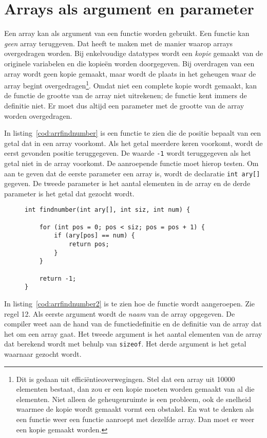 \section{Arrays als argument en parameter}
Een array kan als argument van een functie worden gebruikt. Een functie kan \textsl{geen} array teruggeven. Dat heeft te maken met de manier waarop arrays overgedragen worden. Bij enkelvoudige datatypes wordt een \textsl{kopie} gemaakt van de originele variabelen en die kopieën worden doorgegeven. Bij overdragen van een array wordt geen kopie gemaakt, maar wordt de plaats in het geheugen waar de array begint overgedragen\footnote{Dit is gedaan uit efficiëntieoverwegingen. Stel dat een array uit 10000 elementen bestaat, dan zou er een kopie moeten worden gemaakt van al die elementen. Niet alleen de geheugenruimte is een probleem, ook de snelheid waarmee de kopie wordt gemaakt vormt een obstakel. En wat te denken als een functie weer een functie aanroept met dezelfde array. Dan moet er weer een kopie gemaakt worden.}. Omdat niet een complete kopie wordt gemaakt, kan de functie de grootte van de array niet uitrekenen; de functie kent immers de definitie niet. Er moet dus altijd een parameter met de grootte van de array worden overgedragen.

In listing~\ref{cod:arrfindnumber} is een functie te zien die de positie bepaalt van een getal dat in een array voorkomt. Als het getal meerdere keren voorkomt, wordt de eerst gevonden positie teruggegeven. De waarde \texttt{-1} wordt teruggegeven als het getal niet in de array voorkomt. De aanroepende functie moet hierop testen. Om aan te geven dat de eerste parameter een array is, wordt de declaratie \texttt{int ary[]} gegeven. De tweede parameter is het aantal elementen in de array en de derde parameter is het getal dat gezocht wordt.

\begin{figure}[H]
\begin{lstlisting}[caption=Functie voor het vinden van een getal in een array.,label=cod:arrfindnumber]
int findnumber(int ary[], int siz, int num) {

    for (int pos = 0; pos < siz; pos = pos + 1) {
        if (ary[pos] == num) {
            return pos;
        }
    }
    
    return -1;
}
\end{lstlisting}
\end{figure}

In listing~\ref{cod:arrfindnumber2} is te zien hoe de functie wordt aangeroepen. Zie regel 12. Als eerste argument wordt de \textsl{naam} van de array opgegeven. De compiler weet aan de hand van de functiedefinitie en de definitie van de array dat het om een array gaat. Het tweede argument is het aantal elementen van de array dat berekend wordt met behulp van  \texttt{sizeof}. Het derde argument is het getal waarnaar gezocht wordt.

